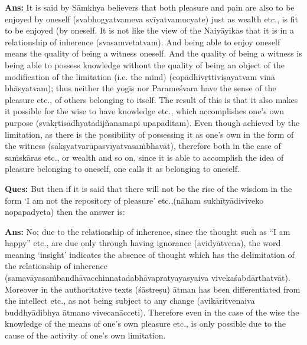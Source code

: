 \textbf{Ans:} It is said by Sāmkhya believers that both pleasure and pain are also to be enjoyed by oneself (svabhogyatvameva svīyatvamucyate) just as wealth etc., is fit to be enjoyed (by oneself. It is not like the view of the Naiyāyikas that it is in a relationship of inherence (svasamvetatvam). And being able to enjoy oneself means the quality of being a witness oneself. And the quality of being a witness is being able to possess knowledge without the quality of being an object of the modification of the limitation (i.e. the mind) (copādhivṛttiviṣayatvam vinā bhāsyatvam); thus neither the yogīs nor Parameśvara have the sense of the pleasure etc., of others belonging to itself. The result of this is that it also makes it possible for the wise to have knowledge etc., which accomplishes one’s own purpose (svakṛtisādhyatādijñanamapi upapāditam). Even though achieved by the limitation, as there is the possibility of possessing it as one’s own in the form of the witness (sākṣyatvarūpasvīyatvasaṁbhavāt), therefore both in the case of saṁskāras etc., or wealth and so on, since it is able to accomplish the idea of pleasure belonging to oneself, one calls it as belonging to oneself.

\textbf{Ques:} But then if it is said that there will not be the rise of the wisdom in the form ‘I am not the repository of pleasure’ etc.,(nāham sukhītyādiviveko nopapadyeta) then the answer is:

\vskip -1pt

\textbf{Ans:}  No; due to the relationship of inherence, since the thought such as “I am happy” etc., are due only through having ignorance (avidyātvena), the word meaning ‘insight’ indicates the absence of thought which has the delimitation of the relationship of inherence (samavāyasaṁbandhāvacchinnatadabhāvapratyayasyaiva vivekaśabdārthatvāt). Moreover in the authoritative texts (śāstreṣu) ātman has been differentiated from the intellect etc., as not being subject to any change (avikāritvenaiva buddhyādibhya ātmano vivecanācceti). Therefore even in the case of the wise the knowledge of the means of one’s own pleasure etc., is only possible due to the cause of the activity of one’s own limitation. 

\vskip -1pt


